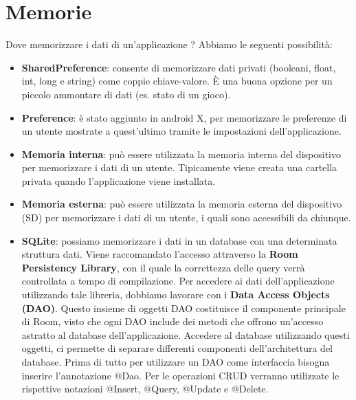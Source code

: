 \chapter{Memorie}
Dove memorizzare i dati di un'applicazione ? Abbiamo le seguenti possibilità:
\begin{itemize}
    \item \textbf{SharedPreference}: consente di memorizzare dati privati (booleani, float, int, long e string) come coppie chiave-valore. È una buona opzione per un piccolo ammontare di dati (es. stato di un gioco).
    \item \textbf{Preference}: è stato aggiunto in android X, per memorizzare le preferenze di un utente mostrate a quest'ultimo tramite le impostazioni dell'applicazione.
    \item \textbf{Memoria interna}: può essere utilizzata la memoria interna del dispositivo per memorizzare i dati di un utente. Tipicamente viene creata una cartella privata quando l'applicazione viene installata.
    \item \textbf{Memoria esterna}: può essere utilizzata la memoria esterna del dispositivo (SD) per memorizzare i dati di un utente, i quali sono accessibili da chiunque.
    \item \textbf{SQLite}: possiamo memorizzare i dati in un database con una determinata struttura dati. Viene raccomandato l'accesso attraverso la \textbf{Room Persistency Library}, con il quale la correttezza delle query verrà controllata a tempo di compilazione. Per accedere ai dati dell'applicazione utilizzando tale libreria, dobbiamo lavorare con i \textbf{Data Access Objects (DAO)}. Questo insieme di oggetti DAO costituisce il componente principale di Room, visto che ogni DAO include dei metodi che offrono un'accesso astratto al database dell'applicazione. Accedere al database utilizzando questi oggetti, ci permette di separare differenti componenti dell'architettura del database. Prima di tutto per utilizzare un DAO come interfaccia bisogna inserire l'annotazione @Dao. Per le operazioni CRUD verranno utilizzate le rispettive notazioni @Insert, @Query, @Update e @Delete.

\end{itemize}
